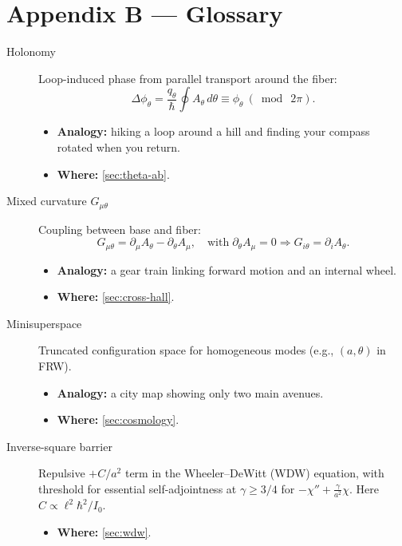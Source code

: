 \section*{Appendix B --- Glossary}\label{sec:appendix-b}
\begin{description}
  \item[Holonomy] Loop-induced phase from parallel transport around the fiber:
  \[
    \Delta\phi_\theta=\frac{q_\theta}{\hbar}\oint A_\theta\,d\theta \equiv \phi_\theta\ (\bmod\ 2\pi).
  \]
  \begin{itemize}
    \item \textbf{Analogy:} hiking a loop around a hill and finding your compass rotated when you return.
    \item \textbf{Where:} \cref{sec:theta-ab}.
  \end{itemize}

  \item[Mixed curvature $G_{\mu\theta}$] Coupling between base and fiber:
  \[
    G_{\mu\theta}=\partial_\mu A_\theta-\partial_\theta A_\mu,\quad \text{with}\; \partial_\theta A_\mu=0\Rightarrow G_{i\theta}=\partial_i A_\theta.
  \]
  \begin{itemize}
    \item \textbf{Analogy:} a gear train linking forward motion and an internal wheel.
    \item \textbf{Where:} \cref{sec:cross-hall}.
  \end{itemize}

  \item[Minisuperspace] Truncated configuration space for homogeneous modes (e.g., $(a,\theta)$ in FRW).
  \begin{itemize}
    \item \textbf{Analogy:} a city map showing only two main avenues.
    \item \textbf{Where:} \cref{sec:cosmology}.
  \end{itemize}

  \item[Inverse-square barrier] Repulsive $+C/a^2$ term in the Wheeler--DeWitt (WDW) equation, with threshold for essential self-adjointness at $\gamma\ge 3/4$ for $-\chi''+\tfrac{\gamma}{a^2}\chi$.
  Here $C\propto \ell^2\hbar^2/I_0$.
  \begin{itemize}
    \item \textbf{Where:} \cref{sec:wdw}.
  \end{itemize}


\end{description}
